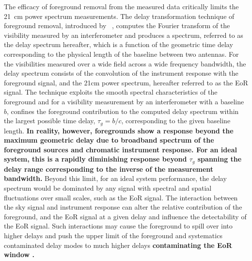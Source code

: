 \documentclass[twocolumn]{emulateapj}
\begin{document}
    The efficacy of foreground removal from the measured data
    critically limits the 21~cm power spectrum measurements. The delay
    transformation technique of foreground removal, introduced by
    ~\citep{Parsons_Backer_2009, Parsons_et_al_2012}, computes the Fourier
    transform of the visibility measured by an interferometer and produces a
    spectrum, referred to as the delay spectrum hereafter, which is a function of
    the geometric time delay corresponding to the physical length of the baseline
    between two antennas. For the visibilities measured over a wide field across a
    wide frequency bandwidth, the delay spectrum consists of the convolution of the instrument
    response with the foreground signal, and the 21cm power spectrum, hereafter
    referred to as the EoR signal.
    The technique exploits the smooth spectral characteristics of the foreground
    and for a %
     visibility measurement by an interferometer
    with a baseline $b$, confines the foreground contribution to the computed delay
    spectrum within the largest possible time delay, $\tau_{g} = b/c$, corresponding to
    the given baseline length. \textbf{In reality, however, foregrounds show a response beyond the maximum geometric delay    
    due to broadband spectrum of the foreground sources and chromatic instrument response. For an ideal system, this 
    is a rapidly diminishing response beyond $\tau_{g}$ spanning the delay range corresponding to the inverse of the  
    measurement bandwidth. }
    Beyond this limit, for an ideal system performance, the delay spectrum would be
    dominated by any signal with spectral and spatial
    fluctuations over small scales, such as the EoR signal.  The interaction between the sky signal and instrument response can
    alter the relative contribution of the foreground, and the
    EoR signal at a given delay and influence the detectability of the EoR
    signal. Such interactions may cause the foreground to spill
    over into higher delays and push the upper limit of the foreground and
    systematics contaminated delay modes to much higher delays \textbf{contaminating the EoR window .} \\
\end{document}
